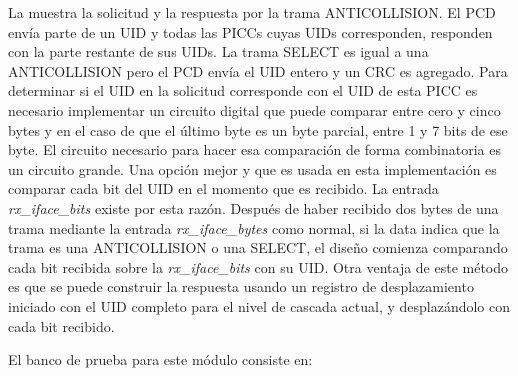 \documentclass[a4paper, twoside, 11pt]{report}
\begin{document}
\newpage

La  muestra la solicitud y la respuesta por la trama ANTICOLLISION. El PCD envía parte de un UID y todas las PICCs cuyas UIDs corresponden, responden con la parte restante de sus UIDs. La trama SELECT es igual a una ANTICOLLISION pero el PCD envía el UID entero y un CRC es agregado. Para determinar si el UID en la solicitud corresponde con el UID de esta PICC es necesario implementar un circuito digital que puede comparar entre cero y cinco bytes y en el caso de que el último byte es un byte parcial, entre 1 y 7 bits de ese byte. El circuito necesario para hacer esa comparación de forma combinatoria es un circuito grande. Una opción mejor y que es usada en esta implementación es comparar cada bit del UID en el momento que es recibido. La entrada \textit{rx\_iface\_bits} existe por esta razón. Después de haber recibido dos bytes de una trama mediante la entrada \textit{rx\_iface\_bytes} como normal, si la data indica que la trama es una ANTICOLLISION o una SELECT, el diseño comienza comparando cada bit recibida sobre la \textit{rx\_iface\_bits} con su UID. Otra ventaja de este método es que se puede construir la respuesta usando un registro de desplazamiento iniciado con el UID completo para el nivel de cascada actual, y desplazándolo con cada bit recibido.

El banco de prueba para este módulo consiste en:
\end{document}
